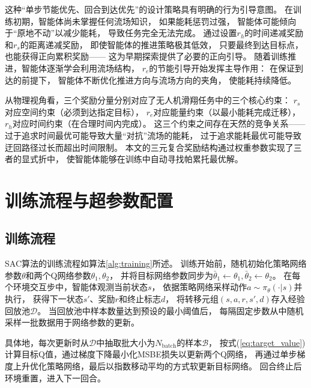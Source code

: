 这种“单步节能优先、回合到达优先”的设计策略具有明确的行为引导意图。
在训练初期，智能体尚未掌握任何流场知识，
如果能耗惩罚过强，
智能体可能倾向于“原地不动”以减少能耗，
导致任务完全无法完成。
通过设置$r_h$的时间递减奖励和$r_s$的距离递减奖励，
即使智能体的推进策略极其低效，
只要最终到达目标点，
也能获得正向累积奖励——
这为早期探索提供了必要的正向引导。
随着训练推进，智能体逐渐学会利用流场结构，
$r_e$的节能引导开始发挥主导作用：
在保证到达的前提下，
智能体不断优化推进方向与流场方向的夹角，
使能耗持续降低。

从物理视角看，三个奖励分量分别对应了无人机滑翔任务中的三个核心约束：
$r_s$对应空间约束（必须到达指定目标），
$r_e$对应能量约束（以最小能耗完成迁移），
$r_h$对应时间约束（在合理时间内完成）。
这三个约束之间存在天然的竞争关系——
过于追求时间最优可能导致大量“对抗”流场的能耗，
过于追求能耗最优可能导致迂回路径过长而超出时间限制。
本文的三元复合奖励结构通过权重参数实现了三者的显式折中，
使智能体能够在训练中自动寻找帕累托最优解。

\section{训练流程与超参数配置}

\subsection{训练流程}

SAC算法的训练流程如算法\ref{alg:training}所述。
训练开始前，随机初始化策略网络参数$\theta$和两个Q网络参数$\theta_1, \theta_2$，
并将目标网络参数同步为$\bar{\theta}_1 \leftarrow \theta_1, \bar{\theta}_2 \leftarrow \theta_2$。
在每个环境交互步中，智能体观测当前状态$s$，
依据策略网络采样动作$a \sim \pi_\theta(\cdot | s)$并执行，
获得下一状态$s'$、奖励$r$和终止标志$d$，
将转移元组$(s, a, r, s', d)$存入经验回放池$\mathcal{D}$。
当回放池中样本数量达到预设的最小阈值后，
每隔固定步数从中随机采样一批数据用于网络参数的更新。

具体地，每次更新时从$\mathcal{D}$中抽取批大小为$N_{\text{batch}}$的样本$\mathcal{B}$，
按式(\ref{eq:target_value})计算目标Q值，通过梯度下降最小化MSBE损失以更新两个Q网络，
再通过单步梯度上升优化策略网络，最后以指数移动平均的方式软更新目标网络。
回合终止后环境重置，进入下一回合。

